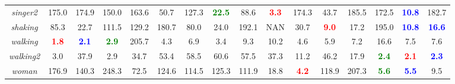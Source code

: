 \documentclass[preprint,12pt,review]{elsarticle}
\begin{document}
\begin{table*}[htp]
{\begin{tabular}{|c|c|c|c|c|c|c|c|c|c|c|c|c|c|c|c|}
\emph{singer2}   &175.0  &174.9  &150.0 &163.6  &50.7  &127.3  &\textcolor{green}{\textbf{22.5}}  &88.6  &\textcolor{red}{\textbf{3.3}}  &174.3  &43.7 &185.5 &172.5  &\textcolor{blue}{\textbf{10.8}} &182.7\\
\emph{shaking}   &85.3  &22.7  &111.5 &129.2 &180.7  &80.0   &24.0   &192.1  &NAN &30.7  &\textcolor{red}{\textbf{9.0}} &17.2  &195.0  &\textcolor{blue}{\textbf{10.8}} &\textcolor{blue}{\textbf{16.6}}\\
\emph{walking}   &\textcolor{red}{\textbf{1.8}}  &\textcolor{blue}{\textbf{2.1}}  &\textcolor{green}{\textbf{2.9}}  &205.7  &4.3 &6.9 &3.4 &9.3 &10.2 &4.6 &5.9 &7.2 &16.6 &7.5  &7.6\\
\emph{walking2}   &3.0  &37.9  &2.9 &34.7  &53.4 &58.5  &60.6 &57.5 &37.3 &11.2 &46.2 &17.9 &\textcolor{green}{\textbf{2.4}} &\textcolor{red}{\textbf{2.1}} &\textcolor{blue}{\textbf{2.3}}\\
\emph{woman}  &176.9  &140.3  &248.3  &72.5  &124.6   &114.5   &125.3 &111.9  &18.8 &\textcolor{red}{\textbf{4.2}}  &118.9 &207.3 &\textcolor{green}{\textbf{5.6}} &\textcolor{blue}{\textbf{5.5}} &9.5\\
\hline
\end{tabular}}
\label{tab:centererror}
\end{table*}
\end{document}
